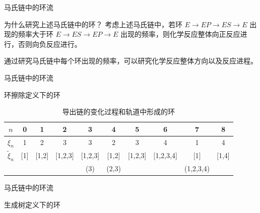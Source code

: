 \documentclass{beamer}
\begin{document}
	\begin{frame}{马氏链中的环流}
		\begin{block}{为什么研究上述马氏链中的环？}
			考虑上述马氏链中，若环 $E \rightarrow EP \rightarrow ES \rightarrow E$ 出现的频率大于环 $E \rightarrow ES \rightarrow EP \rightarrow E$ 出现的频率，则化学反应整体向正反应进行，否则向负反应进行。

			通过研究马氏链中每个环出现的频率，可以研究化学反应整体方向以及反应进程。
		\end{block}
	\end{frame}

	\begin{frame}{马氏链中的环流}
		\begin{block}{环擦除定义下的环}
			\begin{table}[htb!]
				\renewcommand\arraystretch{1}\centering
				\begin{tabular}{cccccccccc} \hline\hline
			   $n$            & 0 & 1 & 2 & 3   & 4     & 5 & 6 & 7         & 8 \\ \hline
			   $\xi_n$         & 1 & 2 & 3 & 3   & 2     & 3 & 4 & 1         & 4 \\ \hline
			   $\tilde{\xi}_n$& {[}1{]} & {[}1,2{]} & {[}1,2,3{]} & {[}1,2,3{]} & {[}1,2{]} & {[}1,2,3{]} & {[}1,2,3,4{]} & {[}1{]} & {[}1,4{]} \\ \hline
				\text{形成的环} &   &   &   & (3) & (2,3) &   &   & (1,2,3,4) &   \\ \hline\hline
				\end{tabular}
				\caption{导出链的变化过程和轨道中形成的环}\label{trajectory}
			\end{table}
		\end{block}

	\end{frame}

	\begin{frame}{马氏链中的环流}
		\begin{block}{生成树定义下的环}
			
			
		\end{block}
		
	\end{frame}
\end{document}
